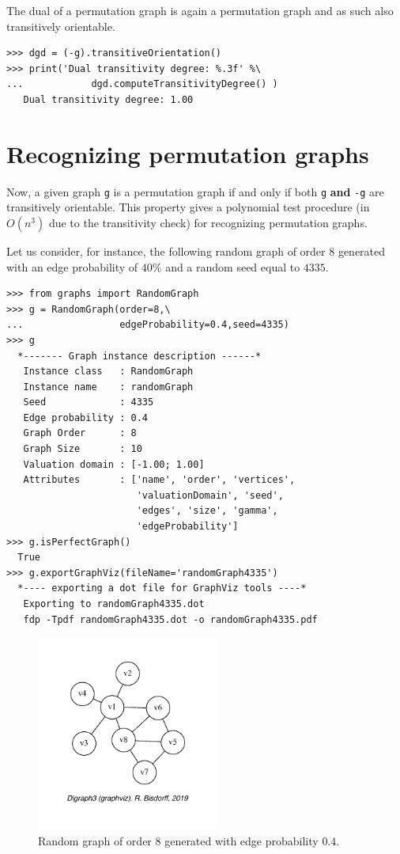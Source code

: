 The dual of a permutation graph is again a permutation graph and as such also transitively orientable.
\begin{lstlisting}
>>> dgd = (-g).transitiveOrientation()
>>> print('Dual transitivity degree: %.3f' %\
...            dgd.computeTransitivityDegree() )
   Dual transitivity degree: 1.00
\end{lstlisting}

\section{Recognizing permutation graphs}
\label{sec:23.4}

Now, a given graph \texttt{g} is a permutation graph if and only if both \texttt{g} \textbf{and} \texttt{-g} are transitively orientable. This  property gives a polynomial test procedure (in $O(n^3)$ due to the transitivity check) for recognizing permutation graphs.

Let us consider, for instance, the following random graph of order 8 generated with an edge probability of $40\%$ and a random seed equal to $4335$.
\begin{lstlisting}
>>> from graphs import RandomGraph
>>> g = RandomGraph(order=8,\
...                 edgeProbability=0.4,seed=4335)
>>> g
  *------- Graph instance description ------*
   Instance class   : RandomGraph
   Instance name    : randomGraph
   Seed             : 4335
   Edge probability : 0.4
   Graph Order      : 8
   Graph Size       : 10
   Valuation domain : [-1.00; 1.00]
   Attributes       : ['name', 'order', 'vertices',
                       'valuationDomain', 'seed',
                       'edges', 'size', 'gamma',
                       'edgeProbability']
>>> g.isPerfectGraph()
  True
>>> g.exportGraphViz(fileName='randomGraph4335')
  *---- exporting a dot file for GraphViz tools ----*
   Exporting to randomGraph4335.dot
   fdp -Tpdf randomGraph4335.dot -o randomGraph4335.pdf
\end{lstlisting}		    
\begin{figure}[h]
\sidecaption[t]
\includegraphics[width=6cm]{Figures/23-8-randomGraph4335.pdf}
\caption{Random graph of order 8 generated with edge probability $0.4$.} 
\label{fig:23.8}       %
\end{figure}

